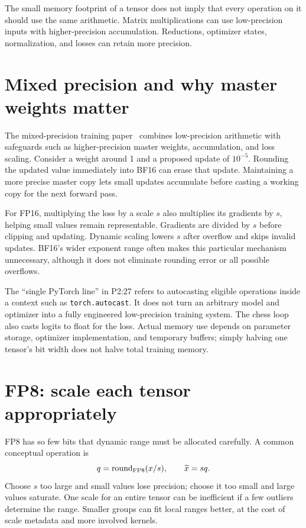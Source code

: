 The small memory footprint of a tensor does not imply that every operation on it should use the same arithmetic. Matrix multiplications can use low-precision inputs with higher-precision accumulation. Reductions, optimizer states, normalization, and losses can retain more precision.

\section{Mixed precision and why master weights matter}
The mixed-precision training paper~\cite{mixed} combines low-precision arithmetic with safeguards such as higher-precision master weights, accumulation, and loss scaling. Consider a weight around 1 and a proposed update of $10^{-5}$. Rounding the updated value immediately into BF16 can erase that update. Maintaining a more precise master copy lets small updates accumulate before casting a working copy for the next forward pass.


For FP16, multiplying the loss by a scale $s$ also multiplies its gradients by $s$, helping small values remain representable. Gradients are divided by $s$ before clipping and updating. Dynamic scaling lowers $s$ after overflow and skips invalid updates. BF16's wider exponent range often makes this particular mechanism unnecessary, although it does not eliminate rounding error or all possible overflows.

The ``single PyTorch line'' in P2:27 refers to autocasting eligible operations inside a context such as \texttt{torch.autocast}. It does not turn an arbitrary model and optimizer into a fully engineered low-precision training system. The chess loop also casts logits to float for the loss. Actual memory use depends on parameter storage, optimizer implementation, and temporary buffers; simply halving one tensor's bit width does not halve total training memory.

\section{FP8: scale each tensor appropriately}
FP8 has so few bits that dynamic range must be allocated carefully. A common conceptual operation is
\[
q=\operatorname{round}_{\rm FP8}(x/s),\qquad \widetilde x=sq.
\]
Choose $s$ too large and small values lose precision; choose it too small and large values saturate. One scale for an entire tensor can be inefficient if a few outliers determine the range. Smaller groups can fit local ranges better, at the cost of scale metadata and more involved kernels.

